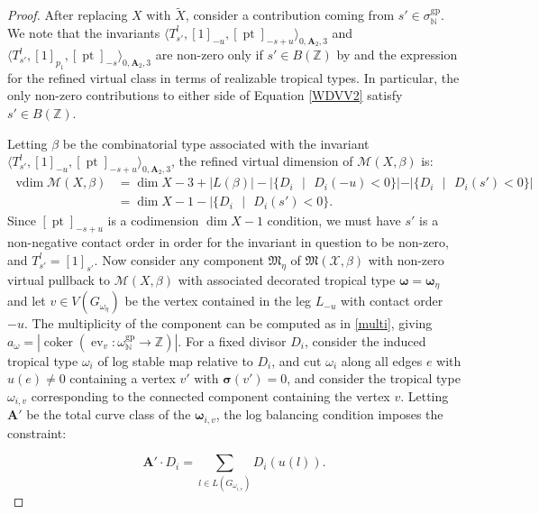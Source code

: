 \documentclass[12pt, oneside]{amsart}   	%
\newcommand{\NN}{\mathbb{N}}
\newcommand{\ZZ}{\mathbb{Z}}
\newcommand{\vdim}{\operatorname{vdim}}
\newcommand{\pt}{\operatorname{pt}}
\newcommand{\ev}{\operatorname{ev}}
\newcommand{\gp}{\operatorname{gp}}
\newcommand{\coker}{\operatorname{coker}}
\numberwithin{equation}{section}
\numberwithin{thm}{section}
\numberwithin{figure}{section}
\begin{document}
\begin{proof}
 After replacing $X$ with $\widetilde{X}$, consider a contribution coming from $s' \in \sigma^{\gp}_{\NN}$. We note that the invariants $\langle T^l_{s'},[1]_{-u},[\pt]_{-s+u}\rangle_{0,\textbf{A}_2,3}$ and $\langle T^l_{s'},[1]_{p_1},[\pt]_{-s}\rangle_{0,\textbf{A}_2,3}$ are non-zero only if $s' \in B(\ZZ)$ by \cite[Lemma $8.6$]{logWDVV} and the expression for the refined virtual class in terms of realizable tropical types. In particular, the only non-zero contributions to either side of Equation \ref{WDVV2} satisfy $s' \in B(\ZZ)$. 

Letting $\beta$ be the combinatorial type associated with the invariant $\langle T^l_{s'},[1]_{-u},[\pt]_{-s+u}\rangle_{0,\textbf{A}_2,3}$, the refined virtual dimension of $\mathscr{M}(X,\beta)$ is:
\begin{equation}\label{vdimb}
\begin{split}
\vdim \mathscr{M}(X,\beta) &= \dim X  -3 + |L(\beta)| - |\{D_i\text{ }|\text{ }D_i(-u)< 0\}| - |\{D_i\text{ }|\text{ }D_i(s')< 0\}| \\
&= \dim X - 1 - |\{D_i\text{ }|\text{ }D_i(s')< 0\}.
\end{split}
\end{equation}
Since $[\pt]_{-s+u}$ is a codimension $\dim X - 1$ condition, we must have $s'$ is a non-negative contact order in order for the invariant in question to be non-zero, and $T^l_{s'} = [1]_{s'}$. 
Now consider any component $\mathfrak{M}_{\eta}$ of $\mathfrak{M}(\mathcal{X},\beta)$ with non-zero virtual pullback to $\mathscr{M}(X,\beta)$ with associated decorated tropical type $\pmb\omega = \pmb\omega_{\eta}$ and let $v \in V(G_{\omega_{\eta}})$ be the vertex contained in the leg $L_{-u}$ with contact order $-u$. The multiplicity of the component can be computed as in \ref{multi}, giving $a_{\omega} = |\coker(\ev_v: \omega_{\NN}^{\gp} \rightarrow \ZZ)|$. For a fixed divisor $D_i$, consider the induced tropical type $\omega_i$ of log stable map relative to $D_i$, and cut $\omega_i$ along all edges $e$ with $u(e)\not= 0$ containing a vertex $v'$ with $\pmb\sigma(v') = 0$, and consider the tropical type $\omega_{i,v}$ corresponding to the connected component containing the vertex $v$. Letting $\textbf{A}'$ be the total curve class of the $\pmb\omega_{i,v}$, the log balancing condition imposes the constraint:

$$\textbf{A}'\cdot D_i = \sum_{l \in L(G_{\omega_{i,v}})} D_i(u(l)).$$


\end{proof}
\end{document}

